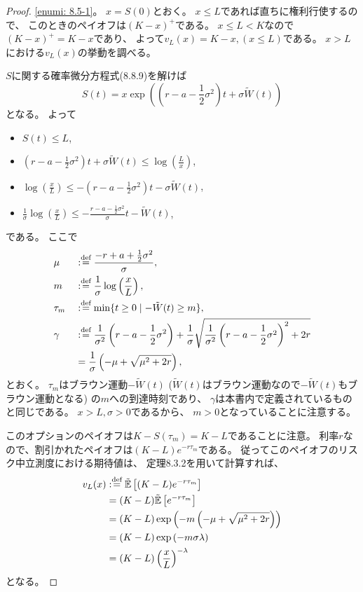 \documentclass[uplatex]{jsarticle}
\theoremstyle{definition}
\def\E{\mathbb{E}}
\def\dfn{:\overset{\mbox{{\scriptsize def}}}{=}}
\begin{document}
\begin{proof}
  \ref{enumi: 8.5-1}。
  \(x = S(0)\)とおく。
  \(x \leq L\)であれば直ちに権利行使するので、
  このときのペイオフは\((K-x)^+\)である。
  \(x \leq L < K\)なので\((K-x)^+ = K-x\)であり、
  よって\(v_L(x) = K-x , (x \leq L)\)である。
  \(x > L\)における\(v_L(x)\)の挙動を調べる。

  \(S\)に関する確率微分方程式(8.8.9)を解けば
  \[
  S(t) = x\exp \left( \left( r-a-\frac{1}{2}\sigma^2\right) t
  + \sigma \tilde{W}(t)\right)
  \]
  となる。
  よって
  \begin{itemize}
    \item[ \ ]
    \(S(t) \leq L\),
    \item[\(\iff\)]
    \(\left( r-a-\frac{1}{2}\sigma^2\right) t
    + \sigma \tilde{W}(t) \leq \log \left( \frac{L}{x}\right) \),
    \item[\(\iff\)]
    \(\log\left( \frac{x}{L} \right) \leq
    - \left( r-a-\frac{1}{2}\sigma^2\right) t - \sigma\tilde{W}(t)\),
    \item[\(\iff\)]
    \(\frac{1}{\sigma}\log\left( \frac{x}{L} \right) \leq
    - \frac{r-a-\frac{1}{2}\sigma^2}{\sigma}t - \tilde{W}(t)\),
  \end{itemize}
  である。
  ここで
  \begin{alignat*}{3}
    &\mu & &\dfn \frac{-r+a+\frac{1}{2}\sigma^2}{\sigma}, \\
    &m & &\dfn \frac{1}{\sigma}\log\left( \frac{x}{L} \right), \\
    &\tau_m & &\dfn \min\{ t \geq 0 \mid -\tilde{W}(t) \geq m\}, \\
    &\gamma & &\dfn \frac{1}{\sigma^2}\left( r-a-\frac{1}{2}\sigma^2 \right)
    + \frac{1}{\sigma}\sqrt{\frac{1}{\sigma^2}
    \left( r-a-\frac{1}{2}\sigma^2\right)^2 + 2r} \\
    & & &= \frac{1}{\sigma}\left( -\mu + \sqrt{\mu^2 + 2r}\right),
  \end{alignat*}
  とおく。
  \(\tau_m\)はブラウン運動\(-\tilde{W}(t)\)
  (\(\tilde{W}(t)\)はブラウン運動なので\(-\tilde{W}(t)\)もブラウン運動となる)
  の\(m\)への到達時刻であり、
  \(\gamma\)は本書内で定義されているものと同じである。
  \(x > L , \sigma > 0\)であるから、
  \(m > 0\)となっていることに注意する。

  このオプションのペイオフは\(K-S(\tau_m) = K-L\)であることに注意。
  利率\(r\)なので、割引かれたペイオフは\((K-L)e^{-r\tau_m}\)である。
  従ってこのペイオフのリスク中立測度における期待値は、
  定理8.3.2を用いて計算すれば、
  \begin{align*}
    v_L(x) &\dfn \tilde{\E}\left[(K-L)e^{-r\tau_m}\right] \\
    &= (K-L) \tilde{\E}\left[e^{-r\tau_m}\right] \\
    &= (K-L) \exp\left( - m\left( -\mu + \sqrt{\mu^2 + 2r}\right)\right) \\
    &= (K-L) \exp\left( - m\sigma\lambda\right) \\
    &= (K-L) \left( \frac{x}{L}\right)^{-\lambda}
  \end{align*}
  となる。


\end{proof}
\end{document}
